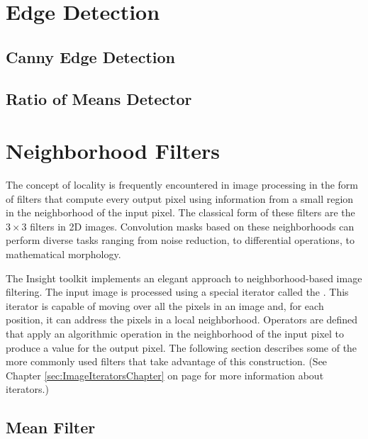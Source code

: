 \section{Edge Detection}

\subsection{Canny Edge Detection}
\ifitkFullVersion

\fi

\subsection{Ratio of Means Detector}




\section{Neighborhood Filters}
\label{sec:NeighborhoodFilters}

The concept of locality is frequently encountered in image processing in the
form of filters that compute every output pixel using information from a small
region in the neighborhood of the input pixel.  The classical form of
these filters are the $3 \times 3$ filters in 2D images. Convolution masks
based on these neighborhoods can perform diverse tasks ranging from noise
reduction, to differential operations, to mathematical morphology.

The Insight toolkit implements an elegant approach to neighborhood-based image
filtering.  The input image is processed using a special iterator called the
. This iterator is capable of moving over all the
pixels in an image and, for each position, it can address the pixels in a local
neighborhood. Operators are defined that apply an algorithmic operation in the
neighborhood of the input pixel to produce a value for the output pixel.  The
following section describes some of the more commonly used filters that take
advantage of this construction. (See Chapter
\ref{sec:ImageIteratorsChapter} on page
\pageref{sec:ImageIteratorsChapter} for more information about iterators.)

\subsection{Mean Filter}
\label{sec:MeanFilter}

\ifitkFullVersion

\fi

